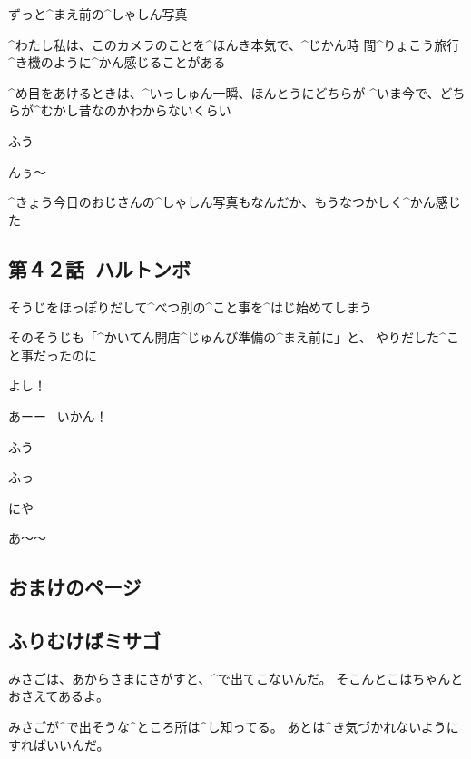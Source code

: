 \A ずっと^{まえ}{前}の^{しゃしん}{写真}

\page[143]
\A ^{わたし}{私}は、このカメラのことを^{ほんき}{本気}で、^{じかん}{時
  間}^{りょこう}{旅行}^{き}{機}のように^{かん}{感}じることがある

\page
\A ^{め}{目}をあけるときは、^{いっしゅん}{一瞬}、ほんとうにどちらが
^{いま}{今}で、どちらが^{むかし}{昔}なのかわからないくらい

\page
\A ふう

\A んぅ〜

\page
\A ^{きょう}{今日}のおじさんの^{しゃしん}{写真}もなんだか、もうなつかしく^{かん}{感}じた


\subsection{第４２話\ ハルトンボ}

\page[148]
\A そうじをほっぽりだして^{べつ}{別}の^{こと}{事}を^{はじ}{始}めてしまう

\page
\A そのそうじも「^{かいてん}{開店}^{じゅんび}{準備}の^{まえ}{前}に」と、
やりだした^{こと}{事}だったのに

\page[154]
\A よし！

\A あーー
\ いかん！

\page[156]
\A ふう

\page[158]
\A ふっ

\A にや

\page[160]
\A あ〜〜


\subsection{おまけのページ}


\subsection{ふりむけばミサゴ}
\T みさごは、あからさまにさがすと、^{で}{出}てこないんだ。
そこんとこはちゃんとおさえてあるよ。

\T みさごが^{で}{出}そうな^{ところ}{所}は^{し}{知}ってる。
あとは^{き}{気}づかれないようにすればいいんだ。
